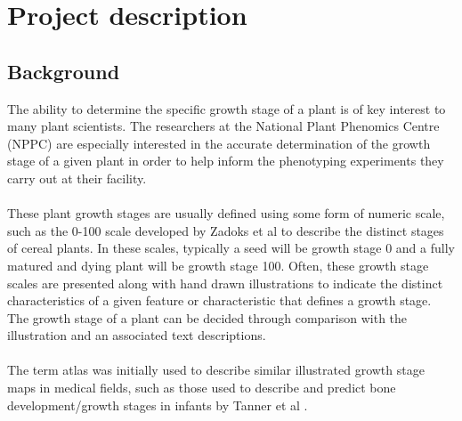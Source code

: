 \documentclass[11pt,fleqn,twoside]{article}
\begin{document}
\wordcount{}

\mmp

\setcounter{tocdepth}{3} %


\section{Project description}
\subsection{Background}
The ability to determine the specific growth stage of a plant is of key interest to many plant scientists. The researchers at the National Plant Phenomics Centre (NPPC)\cite{_nppc} are especially interested in the accurate determination of the growth stage of a given plant in order to help inform the phenotyping experiments they carry out at their facility. 
\\\\
These plant growth stages are usually defined using some form of numeric scale, such as the 0-100 scale developed by Zadoks et al \cite{zadoks_decimal_1974} to describe the distinct stages of cereal plants. In these scales, typically a seed will be growth stage 0 and a fully matured and dying plant will be growth stage 100. Often, these growth stage scales are presented along with hand drawn illustrations to indicate the distinct characteristics of a given feature or characteristic that defines a growth stage. The growth stage of a plant can be decided through comparison with the illustration and an associated text descriptions. 
\\\\
The term atlas was initially used to describe similar illustrated growth stage maps in medical fields, such as those used to describe and predict bone development/growth stages in infants by Tanner et al \cite{tanner_assessment_1975}. 
\end{document}
